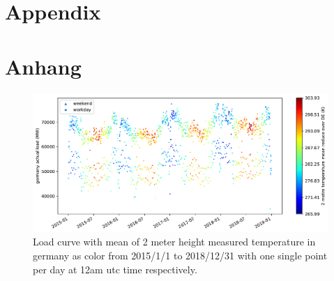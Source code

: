 

{\chapter{Appendix}}    %
{\chapter{Anhang}}      %
\label{chap:appendix}



\begin{figure}[h!]%
\centering
\includegraphics[width=.7\textheight,angle=-90,origin=c]{plots/t2m_mean_2015010112_2018123112_24F}%
\caption{Load curve with mean of 2 meter height measured temperature in germany as color from 2015/1/1 to 2018/12/31 with one single point per day at 12am utc time respectively.}%
\label{fig:t2m_mean_2015010112_2018123112_24F}%
\end{figure}
		
%		
